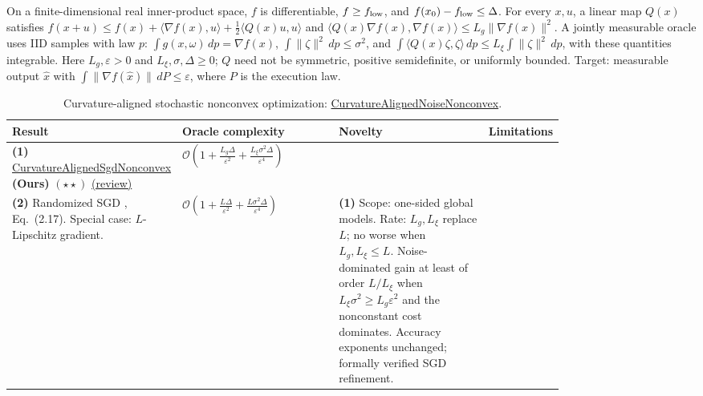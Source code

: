 \begin{table}[tp]
\centering
\caption{Curvature-aligned stochastic nonconvex optimization: \href{https://github.com/k3nfalt/longtails/blob/main/LongTails/Setups/CurvatureAlignedNoiseNonconvex.lean}{CurvatureAlignedNoiseNonconvex}.}\label{tab:CurvatureAlignedNoiseNonconvex}
\parbox{\linewidth}{\footnotesize On a finite-dimensional real inner-product space, $f$ is differentiable, $f\ge f_{\rm low}$, and $f(x_0)-f_{\rm low}\le\Delta$. For every $x,u$, a linear map $Q(x)$ satisfies $f(x+u)\le f(x)+\langle\nabla f(x),u\rangle+\frac12\langle Q(x)u,u\rangle$ and $\langle Q(x)\nabla f(x),\nabla f(x)\rangle\le L_g\|\nabla f(x)\|^2$. A jointly measurable oracle uses IID samples with law $p$: $\int g(x,\omega)\,dp=\nabla f(x)$, $\int\|\zeta\|^2\,dp\le\sigma^2$, and $\int\langle Q(x)\zeta,\zeta\rangle\,dp\le L_\xi\int\|\zeta\|^2\,dp$, with these quantities integrable. Here $L_g,\varepsilon>0$ and $L_\xi,\sigma,\Delta\ge0$; $Q$ need not be symmetric, positive semidefinite, or uniformly bounded. Target: measurable output $\hat x$ with $\int\|\nabla f(\hat x)\|\,dP\le\varepsilon$, where $P$ is the execution law.}\par\smallskip
\begin{threeparttable}
\footnotesize
\setlength{\tabcolsep}{4pt}\renewcommand{\arraystretch}{1.25}
\begin{tabularx}{\linewidth}{@{}>{\raggedright\arraybackslash}p{0.20\linewidth}>{\raggedright\arraybackslash}p{0.30\linewidth}>{\raggedright\arraybackslash}p{0.30\linewidth}>{\raggedright\arraybackslash}X@{}}
\toprule
\textbf{Result} & \textbf{Oracle complexity} & \textbf{Novelty} & \textbf{Limitations} \\
\midrule
\textbf{(1)} \href{https://github.com/k3nfalt/longtails/blob/main/LongTails/Theorems/CurvatureAlignedSgdNonconvex.lean}{Curvature\allowbreak Aligned\allowbreak Sgd\allowbreak Nonconvex} \textbf{(Ours)} $(\star\star)$ \href{https://github.com/k3nfalt/longtails/blob/main/scripts/reviews/CurvatureAlignedSgdNonconvex.md}{(review)}
& $\mathcal{O}\!\left(1+\frac{L_g\Delta}{\varepsilon^2}+\frac{L_\xi\sigma^2\Delta}{\varepsilon^4}\right)$ & & \\
\midrule[1.2pt]
\textbf{(2)} Randomized SGD \citep{canGhadimiLan2013}, Eq.~(2.17).
\newline Special case: $L$-Lipschitz gradient.
& $\mathcal{O}\!\left(1+\frac{L\Delta}{\varepsilon^2}+\frac{L\sigma^2\Delta}{\varepsilon^4}\right)$
& \textbf{(1)} Scope: one-sided global models. Rate: $L_g,L_\xi$ replace $L$; no worse when $L_g,L_\xi\le L$. Noise-dominated gain at least of order $L/L_\xi$ when $L_\xi\sigma^2\ge L_g\varepsilon^2$ and the nonconstant cost dominates. Accuracy exponents unchanged; formally verified SGD refinement.

\end{tabularx}
\end{threeparttable}
\end{table}
